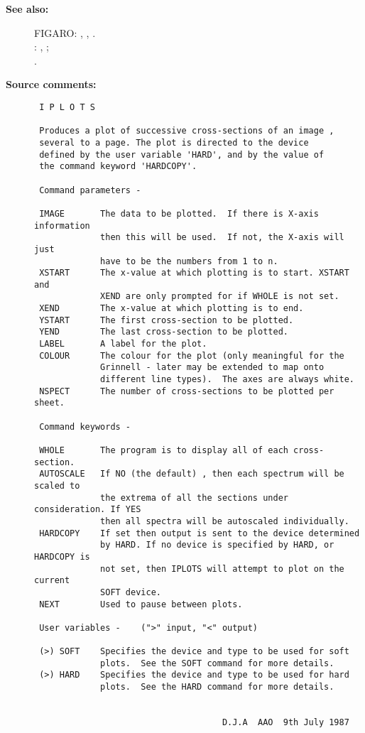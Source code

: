 \begin{description}
\item [{\bf See also:}]
FIGARO: , , .\\
: , ;\\
.\\


\item [{\bf Source comments:}]
\begin{verbatim}
 I P L O T S

 Produces a plot of successive cross-sections of an image ,
 several to a page. The plot is directed to the device
 defined by the user variable 'HARD', and by the value of
 the command keyword 'HARDCOPY'.

 Command parameters -

 IMAGE       The data to be plotted.  If there is X-axis information
             then this will be used.  If not, the X-axis will just
             have to be the numbers from 1 to n.
 XSTART      The x-value at which plotting is to start. XSTART and
             XEND are only prompted for if WHOLE is not set.
 XEND        The x-value at which plotting is to end.
 YSTART      The first cross-section to be plotted.
 YEND        The last cross-section to be plotted.
 LABEL       A label for the plot.
 COLOUR      The colour for the plot (only meaningful for the
             Grinnell - later may be extended to map onto
             different line types).  The axes are always white.
 NSPECT      The number of cross-sections to be plotted per sheet.

 Command keywords -

 WHOLE       The program is to display all of each cross-section.
 AUTOSCALE   If NO (the default) , then each spectrum will be scaled to
             the extrema of all the sections under consideration. If YES
             then all spectra will be autoscaled individually.
 HARDCOPY    If set then output is sent to the device determined
             by HARD. If no device is specified by HARD, or HARDCOPY is
             not set, then IPLOTS will attempt to plot on the current
             SOFT device.
 NEXT        Used to pause between plots.

 User variables -    (">" input, "<" output)

 (>) SOFT    Specifies the device and type to be used for soft
             plots.  See the SOFT command for more details.
 (>) HARD    Specifies the device and type to be used for hard
             plots.  See the HARD command for more details.


                                     D.J.A  AAO  9th July 1987
\end{verbatim}
\end{description}
